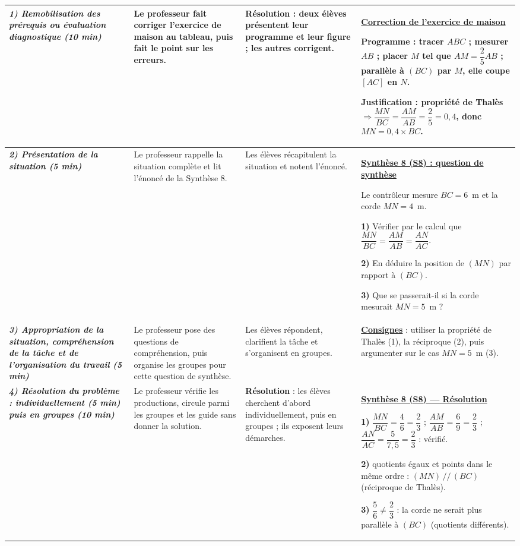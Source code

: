 \documentclass[10pt]{article}
\newcommand{\titreR}[1]{\underline{\textcolor{rougetitre}{\bfseries #1}}}
\newcommand{\seance}[1]{\fcolorbox{bleuseance}{bleufond}{\textcolor{bleuseance}{\bfseries #1}}}
\newcommand{\moment}[1]{\textbf{\itshape #1}}
\begin{document}
\begin{longtable}{|p{2.35cm}|p{5.35cm}|p{4.55cm}|p{13.85cm}|}
\hline
\seance{SEANCE 8} \newline \moment{1) Remobilisation des prérequis ou évaluation diagnostique (10 min)} &
Le professeur fait corriger l'exercice de maison au tableau, puis fait le point sur les erreurs. &
\textbf{Résolution} : deux élèves présentent leur programme et leur figure ; les autres corrigent. &
\titreR{Correction de l'exercice de maison} \par
Programme : tracer $ABC$ ; mesurer $AB$ ; placer $M$ tel que
$AM=\dfrac{2}{5}AB$ ; parallèle à $(BC)$ par $M$, elle coupe $[AC]$ en $N$. \par
Justification : propriété de Thalès $\Rightarrow \dfrac{MN}{BC}=\dfrac{AM}{AB}
=\dfrac{2}{5}=0{,}4$, donc $MN=0{,}4\times BC$. \\ \hline

\moment{2) Présentation de la situation (5 min)} &
Le professeur rappelle la situation  complète et lit l'énoncé de la Synthèse 8. &
Les élèves récapitulent la situation et notent l'énoncé. &
\titreR{Synthèse 8 (S8) : question de synthèse} \par
Le contrôleur mesure $BC=6$~m et la corde $MN=4$~m. \par
\textbf{1)} Vérifier par le calcul que $\dfrac{MN}{BC}=\dfrac{AM}{AB}
=\dfrac{AN}{AC}$. \par
\textbf{2)} En déduire la position de $(MN)$ par rapport à $(BC)$. \par
\textbf{3) } Que se passerait-il si la corde mesurait $MN=5$~m ? \\ \hline

\moment{3) Appropriation de la situation, compréhension de la tâche et de
l'organisation du travail (5 min)} &
Le professeur pose des questions de compréhension, puis organise les groupes pour cette question de synthèse. &
Les élèves répondent, clarifient la tâche et s'organisent en groupes. &
\titreR{Consignes} : utiliser la propriété de Thalès (1), la réciproque (2), puis
argumenter sur le cas $MN=5$~m (3). \\ \hline

\moment{4) Résolution du problème : individuellement (5 min) puis en groupes (10 min)} &
Le professeur vérifie les productions, circule parmi les groupes et les guide sans donner la solution. &
\textbf{Résolution} : les élèves cherchent d'abord individuellement, puis en groupes ; ils exposent leurs démarches. &
\titreR{Synthèse 8 (S8) — Résolution} \par
\textbf{1)} $\dfrac{MN}{BC}=\dfrac{4}{6}=\dfrac{2}{3}$ ;
$\dfrac{AM}{AB}=\dfrac{6}{9}=\dfrac{2}{3}$ ; $\dfrac{AN}{AC}
=\dfrac{5}{7{,}5}=\dfrac{2}{3}$ : vérifié. \par
\textbf{2)} quotients égaux et points dans le même ordre : $(MN)\,//\,(BC)$
(réciproque de Thalès). \par
\textbf{3)} $\dfrac{5}{6}\neq\dfrac{2}{3}$ : la corde ne serait plus parallèle à
$(BC)$ (quotients différents). \\ \hline


\end{longtable}
\end{document}
